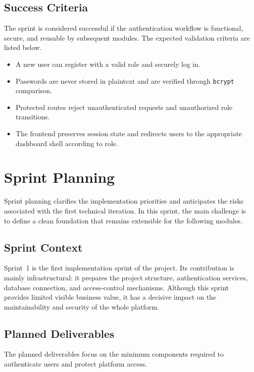 \documentclass[a4paper,12pt]{report}
\begin{document}
\subsection{Success Criteria}

The sprint is considered successful if the authentication workflow is functional, secure, and reusable by subsequent modules. The expected validation criteria are listed below.

\begin{itemize}[leftmargin=*]
  \item[--] A new user can register with a valid role and securely log in.
  \item[--] Passwords are never stored in plaintext and are verified through \texttt{bcrypt} comparison.
  \item[--] Protected routes reject unauthenticated requests and unauthorized role transitions.
  \item[--] The frontend preserves session state and redirects users to the appropriate dashboard shell according to role.
\end{itemize}

\section{Sprint Planning}
\label{sec:sprint1-planning}

Sprint planning clarifies the implementation priorities and anticipates the risks associated with the first technical iteration. In this sprint, the main challenge is to define a clean foundation that remains extensible for the following modules.

\subsection{Sprint Context}

Sprint~1 is the first implementation sprint of the project. Its contribution is mainly infrastructural: it prepares the project structure, authentication services, database connection, and access-control mechanisms. Although this sprint provides limited visible business value, it has a decisive impact on the maintainability and security of the whole platform.

\subsection{Planned Deliverables}

The planned deliverables focus on the minimum components required to authenticate users and protect platform access.
\end{document}
